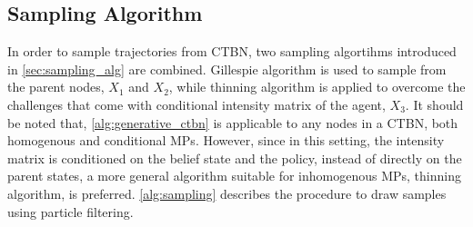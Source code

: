 \subsection{Sampling Algorithm}
In order to sample trajectories from CTBN, two sampling algortihms introduced in \cref{sec:sampling_alg} are combined. Gillespie algorithm is used to sample from the parent nodes, $ X_1 $ and $ X_2 $, while thinning algorithm is applied to overcome the challenges that come with conditional intensity matrix of the agent, $ X_3 $. It should be noted that, \cref{alg:generative_ctbn} is applicable to any nodes in a CTBN, both homogenous and conditional MPs. However, since in this setting, the intensity matrix is conditioned on the belief state and the policy, instead of directly on the parent states, a more general algorithm suitable for inhomogenous MPs, thinning algorithm, is preferred. \cref{alg:sampling} describes the procedure to draw samples using particle filtering. 

